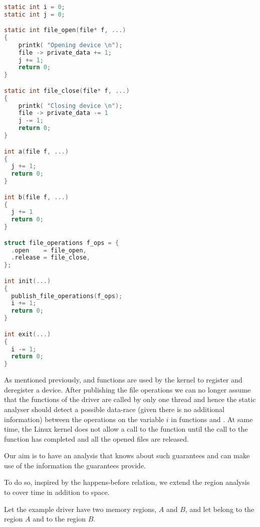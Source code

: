 \documentclass[..thesis.tex]{subfiles}
\begin{document}
\begin{lstlisting}[language=c,style=def]

static int i = 0;
static int j = 0;

static int file_open(file* f, ...)
{
    printk( "Opening device \n");
    file -> private_data += 1;
    j += 1;
    return 0;
}

static int file_close(file* f, ...)
{
    printk( "Closing device \n");
    file -> private_data -= 1
    j -= 1;
    return 0;
}

int a(file f, ...)
{
  j += 1;
  return 0;
}

int b(file f, ...)
{
  j += 1
  return 0;
}

struct file_operations f_ops = {
  .open    = file_open,
  .release = file_close,
};

int init(...)
{
  publish_file_operations(f_ops);
  i += 1;
  return 0;
}

int exit(...)
{
  i -= 1;
  return 0;
}

\end{lstlisting}

As mentioned previously,  and  functions are used by the kernel to register and deregister a device.
After publishing the file operations we can no longer assume that the functions of the driver are called by only one thread and
hence the static analyser should detect a possible data-race (given there is no additional information) between the operations on the variable $i$ in functions  and . 
At same time, the Linux kernel does not allow a call to the  function until the call to the  function has completed and all the opened files are released.

Our aim is to have an analysis that knows about such guarantees and can make use of the information the guarantees provide.


To do so, inspired by the happens-before relation,  we extend the region analysis to cover time in addition to space.


Let the example driver have two memory regions, $A$ and $B$, and let  belong to the region $A$ and  to the region $B$.
\end{document}
